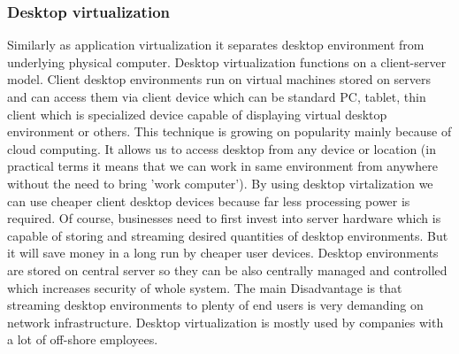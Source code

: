 \subsubsection{Desktop virtualization} 
\label{desktop_virt}
Similarly as application virtualization it separates desktop environment from underlying physical computer. Desktop virtualization functions on a client-server model. Client desktop environments run on virtual machines stored on servers and can access them via client device which can be standard PC, tablet, thin client which is specialized device capable of displaying virtual desktop environment or others. This technique is growing on popularity mainly because of cloud computing. It allows us to access desktop from any device or location (in practical terms it means that we can work in same environment from anywhere without the need to bring 'work computer'). By using desktop virtalization we can use cheaper client desktop devices because far less processing power is required. Of course, businesses need to first invest into server hardware which is capable of storing and streaming desired quantities of desktop environments. But it will save money in a long run by cheaper user devices. Desktop environments are stored on central server so they can be also centrally managed and controlled which increases security of whole system. The main Disadvantage is that streaming desktop environments to plenty of end users is very demanding on network infrastructure. Desktop virtualization is mostly used by companies with a lot of off-shore employees.

